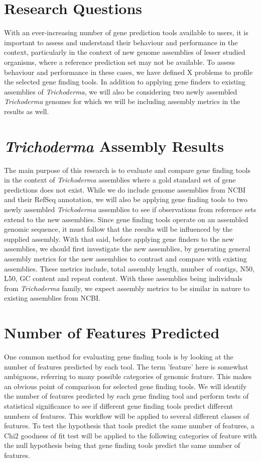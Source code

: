\section{Research Questions}

With an ever-increasing number of gene prediction tools available to
users, it is important to assess and understand their behaviour and
performance in the context, particularly in the context of new genome
assemblies of lesser studied organisms, where a reference prediction
set may not be available. To assess behaviour and performance in these
cases, we have defined X problems to profile the selected gene finding
tools. In addition to applying gene finders to existing assemblies of
\textit{Trichoderma}, we will also be considering two newly assembled
\textit{Trichoderma} genomes for which we will be including assembly
metrics in the results as well.

\section{\textit{Trichoderma} Assembly Results}

The main purpose of this research is to evaluate and compare gene
finding tools in the context of \textit{Trichoderma} assemblies where
a gold standard set of gene predictions does not exist. While we do
include genome assemblies from NCBI and their RefSeq annotation, we
will also be applying gene finding tools to two newly assembled
\textit{Trichoderma} assemblies to see if observations from reference
sets extend to the new assemblies. Since gene finding tools operate on
an assembled genomic sequence, it must follow that the results will be
influenced by the supplied assembly. With that said, before applying
gene finders to the new assemblies, we should first investigate the
new assemblies, by generating general assembly metrics for the new
assemblies to contrast and compare with existing assemblies. These
metrics include, total assembly length, number of contigs, N50, L50,
GC content and repeat content. With these assemblies being individuals
from \textit{Trichoderma} family, we expect assembly metrics to be
similar in nature to existing assemblies from NCBI.

\section{Number of Features Predicted}

One common method for evaluating gene finding tools is by looking at
the number of features predicted by each tool. The term 'feature' here
is somewhat ambiguous, referring to many possible categories of
genomic feature. This makes an obvious point of comparison for
selected gene finding tools. We will identify the number of features
predicted by each gene finding tool and perform tests of statistical
significance to see if different gene finding tools predict different
numbers of features. This workflow will be applied to several
different classes of features. To test the hypothesis that tools
predict the same number of features, a Chi2 goodness of fit test will
be applied to the following categories of feature with the null
hypothesis being that gene finding tools predict the same number of
features.

